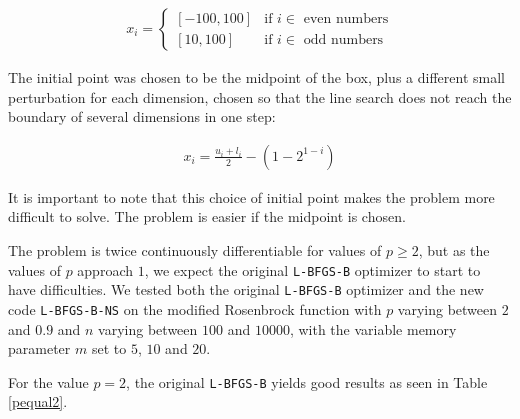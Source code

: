 \begin{equation}
  \begin{aligned}
    x_i = 
    \begin{cases}
      [-100, 100] & \text{if } i \in \text{ even numbers} \\
      [10, 100] & \text{if } i \in \text{ odd numbers}
    \end{cases}
  \end{aligned}
\end{equation}

The initial point was chosen to be the midpoint of the box, plus a different small perturbation for each dimension, chosen so that the line search does not reach the boundary of several dimensions in one step:

\begin{equation}
  \begin{aligned}
    x_i = \frac{u_i + l_i}{2} - \left(1 - 2^{1 - i}\right)
  \end{aligned}
\end{equation}

It is important to note that this choice of initial point makes the problem more difficult to solve. The problem is easier if the midpoint is chosen.

The problem is twice continuously differentiable for values of $p \geq 2$, but as the values of $p$ approach $1$, we expect the original \texttt{L-BFGS-B} optimizer to start to have difficulties. We tested both the original \texttt{L-BFGS-B} optimizer and the new code \texttt{L-BFGS-B-NS} on the modified Rosenbrock function with $p$ varying between $2$ and $0.9$ and $n$ varying between $100$ and $10000$, with the variable memory parameter $m$ set to $5$, $10$ and $20$.

For the value $p = 2$, the original \texttt{L-BFGS-B} yields good results as seen in Table \ref{pequal2}.

